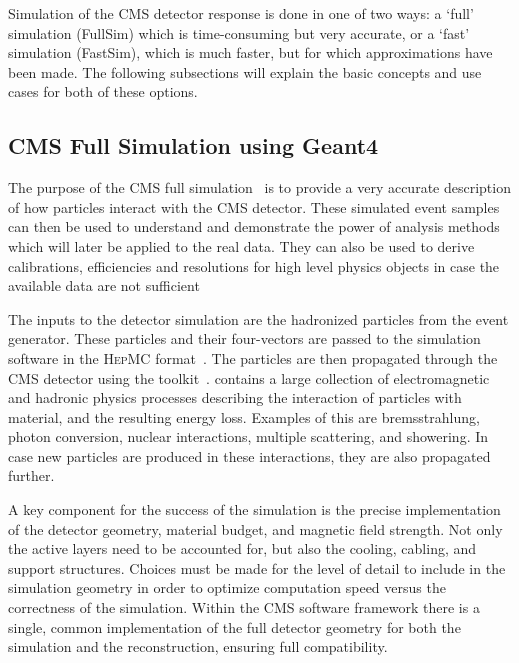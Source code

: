 
Simulation of the CMS detector response is done in one of two ways: a `full' simulation
(FullSim) which is time-consuming but very accurate, or a `fast' simulation (FastSim), which is much
faster, but for which approximations have been made. The following subsections will explain the
basic concepts and use cases for both of these options. 

\subsection{CMS Full Simulation using Geant4 \label{subsec:fullsim}}

The purpose of the CMS full simulation~\cite{Banerjee:2007zz,Banerjee:2011zzc,Banerjee:2012ge} is to
provide a very accurate description of how particles interact with the CMS detector. These simulated
event samples can then be used to understand and demonstrate the power of analysis methods which
will later be applied to the real data. They can also be used to derive calibrations, efficiencies
and resolutions for high level physics objects in case the available data are not sufficient

The inputs to the detector simulation are the hadronized particles from the event generator. These
particles and their four-vectors are passed to the simulation software in the \textsc{HepMC}
format~\cite{Dobbs:2001ck}. 
The particles are then propagated through the CMS detector using the \GEANTfour toolkit~\cite{G4}.
\GEANTfour contains a large collection of electromagnetic and hadronic physics processes describing
the interaction of particles with material, and the resulting energy loss. Examples of this are
bremsstrahlung, photon conversion, nuclear interactions, multiple scattering, and showering. In
case new particles are produced in these interactions, they are also propagated further. 

A key component for the success of the simulation is the precise implementation of the detector
geometry, material budget, and magnetic field strength. Not only the active layers need to be
accounted for, but also the cooling, cabling, and support structures. 
Choices must be made for the level of detail to include in the simulation geometry in order to
optimize computation speed versus the correctness of the simulation.
Within the CMS software framework there is a single, common implementation of the full detector
geometry for both the simulation and the reconstruction, ensuring full compatibility.

